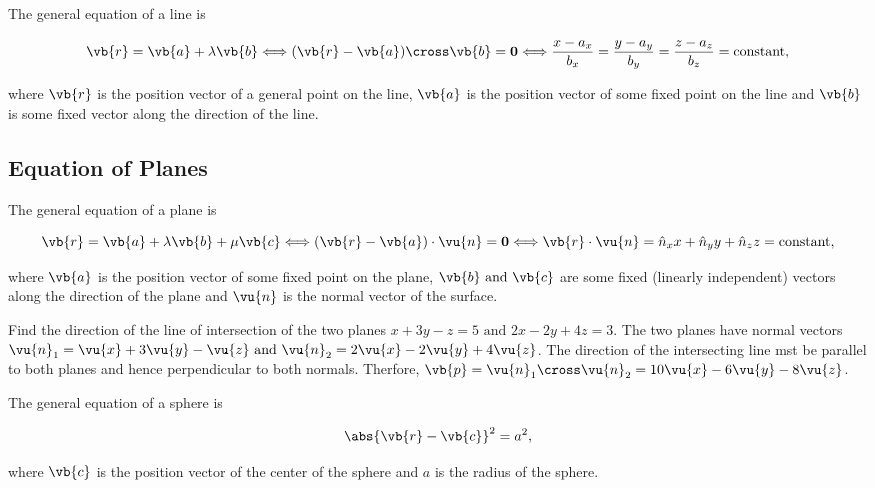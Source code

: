 \documentclass[a4paper,12pt]{report}
\begin{document}
The general equation of a line is 

\begin{equation}
    \vb{r} = \vb{a} + \lambda \vb{b} \Longleftrightarrow (\vb{r} - \vb{a} ) \cross \vb{b} = \boldsymbol{0} \Longleftrightarrow \frac{x-a_{x} }{b_{x} } = \frac{y - a_{y} }{b_{y} } = \frac{z - a_{z} }{b_{z} } = \text{constant}, 
\end{equation}

where \(\vb{r} \) is the position vector of a general point on the line, \(\vb{a} \) is the position vector of some fixed point on the line and \(\vb{b} \) is some fixed vector along the direction of the line.   

\subsection{Equation of Planes}

The general equation of a plane is 

\begin{equation}
    \vb{r} = \vb{a} + \lambda \vb{b} + \mu \vb{c} \Longleftrightarrow (\vb{r} - \vb{a} ) \cdot \vu{n} = \boldsymbol{0} \Longleftrightarrow \vb{r} \cdot \vu{n} = \hat{n}_{x} x + \hat{n}_{y} y + \hat{n}_{z} z = \text{constant} , 
\end{equation}

where \(\vb{a} \) is the position vector of some fixed point on the plane, \(\vb{b} \text { and } \vb{c} \) are some fixed (linearly independent) vectors along the direction of the plane and \(\vu{n}\) is the normal vector of the surface. 

{Find the direction of the line of intersection of the two planes \(x+3y-z=5 \text { and } 2x-2y+4z=3\). }
{The two planes have normal vectors \(\vu{n} _{1} = \vu{x} + 3\vu{y} -\vu{z} \text { and } \vu{n} _{2} = 2\vu{x} -2\vu{y} + 4\vu{z}   \). The direction of the intersecting line mst be parallel to both planes and hence perpendicular to both normals. Therfore, \(\vb{p} = \vu{n} _{1}\cross \vu{n} _{2} = 10\vu{x}-6\vu{y} -8\vu{z}   \). } 

The general equation of a sphere is 

\begin{equation}
    \abs{\vb{r} - \vb{c} }^2 = a^2, 
\end{equation}

where \(\vb{c} \) is the position vector of the center of the sphere and \(a\) is the radius of the sphere.
\end{document}
